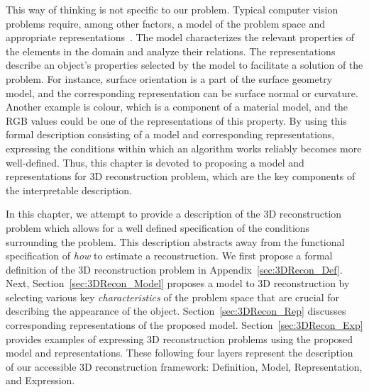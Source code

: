
This way of thinking is not specific to our problem. Typical computer vision problems require, among other factors, a model of the problem space and appropriate representations~\cite{little1985phdthesis}. The model characterizes the relevant properties of the elements in the domain and analyze their relations. The representations describe an object's properties selected by the model to facilitate a solution of the problem. For instance, surface orientation is a part of the surface geometry model, and the corresponding representation can be surface normal or curvature. Another example is colour, which is a component of a material model, and the RGB values could be one of the representations of this property. By using this formal description consisting of a model and corresponding representations, expressing the conditions within which an algorithm works reliably becomes more well-defined. Thus, this chapter is devoted to proposing a model and representations for 3D reconstruction problem, which are the key components of the interpretable description.

In this chapter, we attempt to provide a description of the 3D reconstruction problem which allows for a well defined specification of the conditions surrounding the problem. This description abstracts away from the functional specification of \textit{how} to estimate a reconstruction. We first propose a formal definition of the 3D reconstruction problem in Appendix~\ref{sec:3DRecon_Def}. Next, Section~\ref{sec:3DRecon_Model} proposes a model to 3D reconstruction by selecting various key \textit{characteristics} of the problem space that are crucial for describing the appearance of the object. Section~\ref{sec:3DRecon_Rep} discusses corresponding representations of the proposed model. Section~\ref{sec:3DRecon_Exp} provides examples of expressing 3D reconstruction problems using the proposed model and representations. These following four layers represent the description of our accessible 3D reconstruction framework: Definition, Model, Representation, and Expression.


